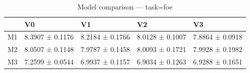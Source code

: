 \begin{table}[htbp]
\centering
\caption{Model comparison — task=foe}
\label{tab:models:foe}
\begin{tabular}{lllll}
\toprule
\toprule
 & V0 & V1 & V2 & V3 \\
\midrule
\midrule
M1 & 8.3907 ± 0.1176 & 8.2184 ± 0.1766 & 8.0128 ± 0.1007 & 7.8864 ± 0.0918 \\
M2 & 8.0507 ± 0.1148 & 7.9787 ± 0.1458 & 8.0093 ± 0.1721 & 7.9928 ± 0.1982 \\
M3 & 7.2599 ± 0.0544 & 6.9937 ± 0.1157 & 6.9034 ± 0.1263 & 6.9288 ± 0.1651 \\
\bottomrule
\end{tabular}\end{table}

